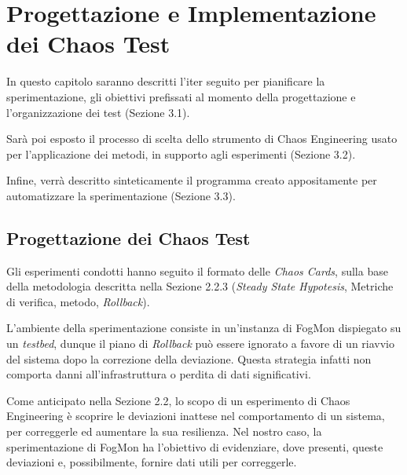 \chapter{Progettazione e Implementazione dei Chaos Test}
In questo capitolo saranno descritti l'iter seguito per pianificare la sperimentazione, gli obiettivi prefissati al momento della progettazione e l'organizzazione dei test (Sezione 3.1).


Sarà poi esposto il processo di scelta dello strumento di Chaos Engineering usato per l'applicazione dei metodi, in supporto agli esperimenti (Sezione 3.2).

Infine, verrà descritto sinteticamente il programma creato appositamente per automatizzare la sperimentazione (Sezione 3.3).
    \section{Progettazione dei Chaos Test}
    \label{subsec:cards}
    Gli esperimenti condotti hanno seguito il formato delle \textit{Chaos Cards}, sulla base della metodologia descritta nella Sezione 2.2.3 (\textit{Steady State Hypotesis}, Metriche di verifica, metodo, \textit{Rollback}).
    
    L'ambiente della sperimentazione consiste in un'instanza di FogMon dispiegato su un \textit{testbed}, dunque il piano di \textit{Rollback} può essere ignorato a favore di un riavvio del sistema dopo la correzione della deviazione. Questa strategia infatti non comporta danni all'infrastruttura o perdita di dati significativi.
    
    
    Come anticipato nella Sezione 2.2, lo scopo di un esperimento di Chaos Engineering è scoprire le deviazioni inattese nel comportamento di un sistema, per correggerle ed aumentare la sua resilienza. Nel nostro caso, la sperimentazione di FogMon ha l'obiettivo di evidenziare, dove presenti, queste deviazioni e, possibilmente, fornire dati utili per correggerle.
